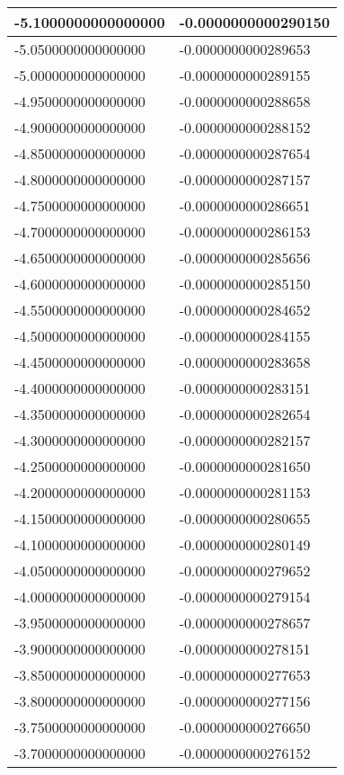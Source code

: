 \documentclass[a4paper,14pt]{article}
\begin{document}
\begin{longtable}{|l|l|}
-5.1000000000000000	&	-0.0000000000290150\\ \hline
-5.0500000000000000	&	-0.0000000000289653\\ \hline
-5.0000000000000000	&	-0.0000000000289155\\ \hline
-4.9500000000000000	&	-0.0000000000288658\\ \hline
-4.9000000000000000	&	-0.0000000000288152\\ \hline
-4.8500000000000000	&	-0.0000000000287654\\ \hline
-4.8000000000000000	&	-0.0000000000287157\\ \hline
-4.7500000000000000	&	-0.0000000000286651\\ \hline
-4.7000000000000000	&	-0.0000000000286153\\ \hline
-4.6500000000000000	&	-0.0000000000285656\\ \hline
-4.6000000000000000	&	-0.0000000000285150\\ \hline
-4.5500000000000000	&	-0.0000000000284652\\ \hline
-4.5000000000000000	&	-0.0000000000284155\\ \hline
-4.4500000000000000	&	-0.0000000000283658\\ \hline
-4.4000000000000000	&	-0.0000000000283151\\ \hline
-4.3500000000000000	&	-0.0000000000282654\\ \hline
-4.3000000000000000	&	-0.0000000000282157\\ \hline
-4.2500000000000000	&	-0.0000000000281650\\ \hline
-4.2000000000000000	&	-0.0000000000281153\\ \hline
-4.1500000000000000	&	-0.0000000000280655\\ \hline
-4.1000000000000000	&	-0.0000000000280149\\ \hline
-4.0500000000000000	&	-0.0000000000279652\\ \hline
-4.0000000000000000	&	-0.0000000000279154\\ \hline
-3.9500000000000000	&	-0.0000000000278657\\ \hline
-3.9000000000000000	&	-0.0000000000278151\\ \hline
-3.8500000000000000	&	-0.0000000000277653\\ \hline
-3.8000000000000000	&	-0.0000000000277156\\ \hline
-3.7500000000000000	&	-0.0000000000276650\\ \hline
-3.7000000000000000	&	-0.0000000000276152\\ \hline

\end{longtable}
\end{document}
